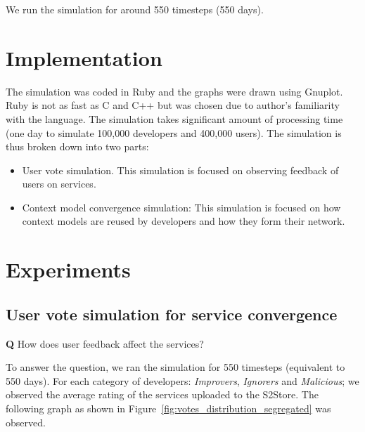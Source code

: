 We run the simulation for around 550 timesteps (550 days).

\section{Implementation}

The simulation was coded in Ruby and the graphs were drawn using Gnuplot. Ruby is not as fast as C and C++ but was chosen due to author's familiarity with the language. The simulation takes significant amount of processing time (one day to simulate 100,000 developers and 400,000 users). The simulation is thus broken down into two parts:

\begin{itemize}
  \item User vote simulation. This simulation is focused on observing feedback of users on services.
  \item Context model convergence simulation: This simulation is focused on how context models are reused by developers and how they form their network.
\end{itemize}

\section{Experiments}
\label{sec:experiments}

\subsection{User vote simulation for service convergence}

\textbf{Q} How does user feedback affect the services?

To answer the question, we ran the simulation for 550 timesteps (equivalent to 550 days). For each category of developers: \emph{Improvers}, \emph{Ignorers} and \emph{Malicious}; we observed the average rating of the services uploaded to the S2Store. The following graph as shown in Figure~\ref{fig:votes_distribution_segregated} was observed.

